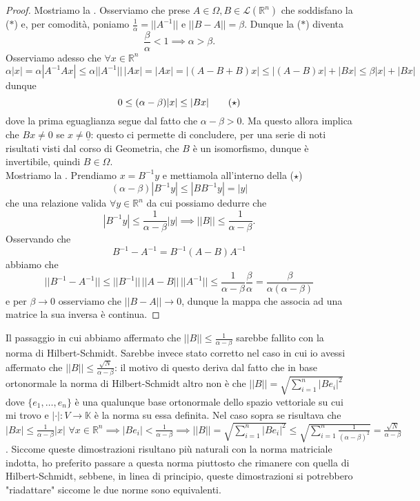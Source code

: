 \begin{proof}
Mostriamo la . Osserviamo che prese $A \in \mathit{\Omega}, B \in \mathcal{L}(\mathbb{R}^n)$ che soddisfano la ($\ast$) e, per comodità, poniamo $\frac{1}{\alpha} = || A^{-1} ||$ e $|| B - A || = \beta$. Dunque la ($\ast$) diventa
$$
\frac{\beta}{\alpha} < 1 \implies \alpha > \beta.
$$
Osserviamo adesso che $\forall x \in \mathbb{R}^n$
$$
\alpha |x| = \alpha | A^{-1} A x | \leq \alpha || A^{-1} || \, |Ax| = |Ax| = |(A - B + B)x| \leq |(A-B)x| + |Bx| \leq \beta |x| + |Bx|
$$
dunque
\begin{equation*}
0 \leq (\alpha - \beta) |x| \leq |Bx| \tag{\text{$\star$}}
\end{equation*}
dove la prima eguaglianza segue dal fatto che $\alpha - \beta > 0$. Ma questo allora implica che $Bx \neq 0$ se $x \neq \underline{0}$: questo ci permette di concludere, per una serie di noti risultati visti dal corso di Geometria, che $B$ è un isomorfismo, dunque è invertibile, quindi $B \in \mathit{\Omega}$. \\
Mostriamo la . Prendiamo $x = B^{-1}y$ e mettiamola all'interno della ($\star$)
$$
(\alpha - \beta) |B^{-1}y| \leq |BB^{-1}y| = |y|
$$
che una relazione valida $\forall y \in \mathbb{R}^n$ da cui possiamo dedurre che
$$
    |B^{-1}y| \leq \frac{1}{\alpha - \beta} |y| \implies || B || \leq \frac{1}{\alpha - \beta}.
$$
Osservando che
$$
    B^{-1} - A^{-1} = B^{-1} (A-B) A^{-1}
$$
abbiamo che
$$
|| B^{-1} - A^{-1} || \leq || B^{-1} || \, || A - B || \, || A^{-1} || \leq \frac{1}{\alpha - \beta} \frac{\beta}{\alpha} = \frac{\beta}{\alpha (\alpha - \beta)}
$$
e per $\beta \to 0$ osserviamo che $|| B - A || \to 0$, dunque la mappa che associa ad una matrice la sua inversa è continua.
\end{proof}
\begin{remark}
    Il passaggio in cui abbiamo affermato che $|| B || \leq \frac{1}{\alpha - \beta}$ sarebbe fallito con la norma di Hilbert-Schmidt. Sarebbe invece stato corretto nel caso in cui io avessi affermato che $|| B || \leq \frac{\sqrt{N}}{\alpha - \beta}$: il motivo
    di questo deriva dal fatto che in base ortonormale la norma di Hilbert-Schmidt altro non è che $|| B || = \sqrt{\sum\limits_{i=1}^n |Be_i|^2}$ dove $\{e_1, \ldots, e_n \}$ è una qualunque base ortonormale dello spazio vettoriale su cui mi trovo e $|\cdot|:V \to \mathbb{K}$ è la norma su essa definita. Nel caso sopra se risultava che
    $|Bx| \leq \frac{1}{\alpha - \beta} |x| \, \, \forall x \in \mathbb{R}^n \implies |Be_i| < \frac{1}{\alpha - \beta} \implies || B || = \sqrt{\sum\limits_{i=1}^n |Be_i|^2} \leq \sqrt{\sum\limits_{i=1}^n \frac{1}{(\alpha - \beta)^2}} = \frac{\sqrt{N}}{\alpha - \beta}$. Siccome queste dimostrazioni risultano più naturali con la norma matriciale indotta, ho preferito
    passare a questa norma piuttosto che rimanere con quella di Hilbert-Schmidt, sebbene, in linea di principio, queste dimostrazioni si potrebbero "riadattare" siccome le due norme sono equivalenti.
\end{remark}
